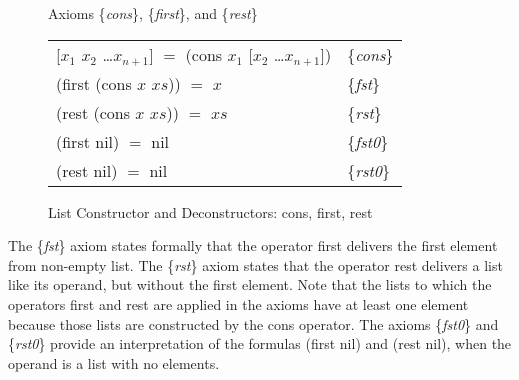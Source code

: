 \begin{figure}
\begin{center}
 Axioms \{\emph{cons}\}, \{\emph{first}\}, and \{\emph{rest}\} \\
\begin{tabular}{ll}
 \textsf{[$x_1$ $x_2$ \dots $x_{n+1}$]} $=$ \textsf{(cons $x_1$ [$x_2$ \dots $x_{n+1}$])} & \{\emph{cons}\} \\
 \textsf{(first (cons $x$ $xs$))} $=$ $x$                                        & \{\emph{fst}\}\\
 \textsf{(rest (cons $x$ $xs$))}  $=$ $xs$                                       & \{\emph{rst}\} \\
 \textsf{(first nil)} $=$ \textsf{nil}                                           & \{\emph{fst0}\}\\
 \textsf{(rest nil)} $=$ \textsf{nil}                                            & \{\emph{rst0}\}\\
\end{tabular}
\end{center}
\caption{List Constructor and Deconstructors: \textsf{cons}, \textsf{first}, \textsf{rest}}
\label{first-rest-cons}
\end{figure}

The \{\emph{fst}\} axiom states formally that
the operator \textsf{first} delivers the first element from non-empty list.
The \{\emph{rst}\} axiom states that the operator \textsf{rest} delivers
a list like its operand, but without the first element.
Note that the lists to which the operators \textsf{first} and \textsf{rest}
are applied in the axioms have at least one element
because those lists are constructed by the \textsf{cons} operator.
The axioms
\{\emph{fst0}\} and \{\emph{rst0}\}
provide an interpretation of the formulas
(first nil) and \textsf{(rest nil)},
when the operand is a list with no elements.

